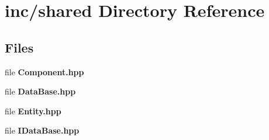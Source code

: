 \section{inc/shared Directory Reference}
\label{dir_ecda0f287c307d056b3c2cb239b6c6d3}
\subsection*{Files}
\begin{DoxyCompactItemize}
\item 
file {\bf Component.\+hpp}
\item 
file {\bf Data\+Base.\+hpp}
\item 
file {\bf Entity.\+hpp}
\item 
file {\bf I\+Data\+Base.\+hpp}
\end{DoxyCompactItemize}
